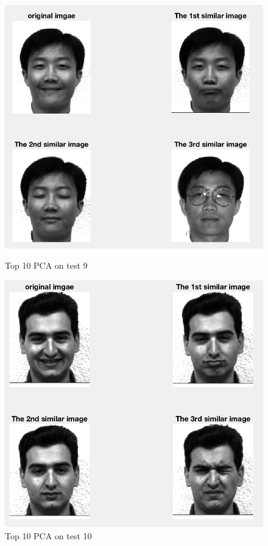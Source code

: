 \documentclass{article}
\begin{document}
\begin{figure}[htbp]
\centering
\begin{minipage}[t]{0.48\textwidth}
\centering
\includegraphics[scale = 0.3]{10_9.png}
\caption{Top 10 PCA on test 9}
\end{minipage}
\begin{minipage}[t]{0.48\textwidth}
\centering
\includegraphics[scale = 0.3]{10_10.png}
\caption{Top 10 PCA on test 10}
\end{minipage}
\end{figure}
\end{document}
